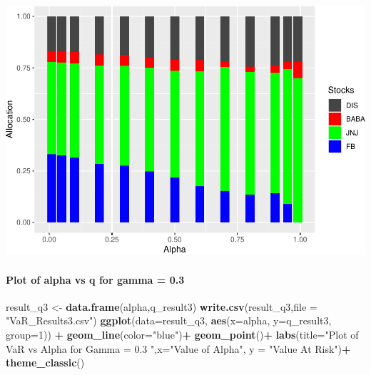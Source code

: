 \documentclass[]{article}
\newenvironment{Shaded}{\begin{snugshade}}{\end{snugshade}}
\newcommand{\KeywordTok}[1]{\textcolor[rgb]{0.13,0.29,0.53}{\textbf{#1}}}
\newcommand{\DataTypeTok}[1]{\textcolor[rgb]{0.13,0.29,0.53}{#1}}
\newcommand{\DecValTok}[1]{\textcolor[rgb]{0.00,0.00,0.81}{#1}}
\newcommand{\StringTok}[1]{\textcolor[rgb]{0.31,0.60,0.02}{#1}}
\newcommand{\OperatorTok}[1]{\textcolor[rgb]{0.81,0.36,0.00}{\textbf{#1}}}
\newcommand{\NormalTok}[1]{#1}
\let\oldparagraph\paragraph
\renewcommand{\paragraph}[1]{\oldparagraph{#1}\mbox{}}
\begin{document}
\includegraphics{Integrated_Management_Formulation_Model_files/figure-latex/unnamed-chunk-12-2.pdf}

\paragraph{Plot of alpha vs q for gamma =
0.3}\label{plot-of-alpha-vs-q-for-gamma-0.3}

\begin{Shaded}
\begin{Highlighting}[]
\NormalTok{result_q3 <-}\StringTok{ }\KeywordTok{data.frame}\NormalTok{(alpha,q_result3)}
\KeywordTok{write.csv}\NormalTok{(result_q3,}\DataTypeTok{file =} \StringTok{"VaR_Results3.csv"}\NormalTok{)}
\KeywordTok{ggplot}\NormalTok{(}\DataTypeTok{data=}\NormalTok{result_q3, }\KeywordTok{aes}\NormalTok{(}\DataTypeTok{x=}\NormalTok{alpha, }\DataTypeTok{y=}\NormalTok{q_result3, }\DataTypeTok{group=}\DecValTok{1}\NormalTok{)) }\OperatorTok{+}
\StringTok{  }\KeywordTok{geom_line}\NormalTok{(}\DataTypeTok{color=}\StringTok{"blue"}\NormalTok{)}\OperatorTok{+}
\StringTok{  }\KeywordTok{geom_point}\NormalTok{()}\OperatorTok{+}
\StringTok{  }\KeywordTok{labs}\NormalTok{(}\DataTypeTok{title=}\StringTok{"Plot of VaR vs Alpha for Gamma = 0.3 "}\NormalTok{,}\DataTypeTok{x=}\StringTok{"Value of Alpha"}\NormalTok{, }\DataTypeTok{y =} \StringTok{"Value At Risk"}\NormalTok{)}\OperatorTok{+}
\StringTok{  }\KeywordTok{theme_classic}\NormalTok{()}
\end{Highlighting}
\end{Shaded}
\end{document}
